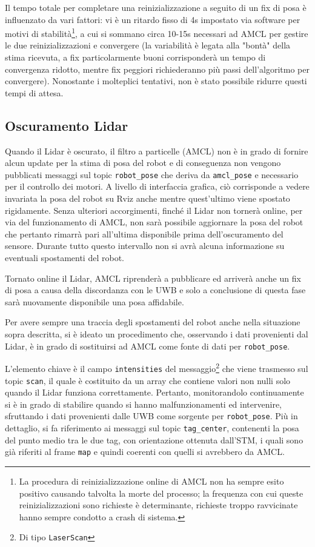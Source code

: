 Il tempo totale per completare una reinizializzazione a seguito di un fix di posa è influenzato da vari fattori: vi è un ritardo fisso di 4s impostato via software per motivi di stabilità\footnote{La procedura di reinizializzazione online di AMCL non ha sempre esito positivo causando talvolta la morte del processo; la frequenza con cui queste reinizializzazioni sono richieste è determinante, richieste troppo ravvicinate hanno sempre condotto a crash di sistema.}, a cui si sommano circa 10-15s necessari ad AMCL per gestire le due reinizializzazioni e convergere (la variabilità è legata alla "bontà" della stima ricevuta, a fix particolarmente buoni corrisponderà un tempo di convergenza ridotto, mentre fix peggiori richiederanno più passi dell'algoritmo per convergere). Nonostante i molteplici tentativi, non è stato possibile ridurre questi tempi di attesa.

\subsection{Oscuramento Lidar}
\label{correzione_oscuramento_lidar}
Quando il Lidar è oscurato, il filtro a particelle (AMCL) non è in grado di fornire alcun update per la stima di posa del robot e di conseguenza non vengono pubblicati messaggi sul topic \texttt{\/robot\_pose} che deriva da \texttt{\/amcl\_pose} e necessario per il controllo dei motori. A livello di interfaccia grafica, ciò corrisponde a vedere invariata la posa del robot su Rviz anche mentre quest'ultimo viene spostato rigidamente. 
Senza ulteriori accorgimenti, finché il Lidar non tornerà online, per via del funzionamento di AMCL, non sarà possibile aggiornare la posa del robot che pertanto rimarrà pari all'ultima disponibile prima dell'oscuramento del sensore. Durante tutto questo intervallo non si avrà alcuna informazione su eventuali spostamenti del robot.

Tornato online il Lidar, AMCL riprenderà a pubblicare ed arriverà anche un fix di posa a causa della discordanza con le UWB e solo a conclusione di questa fase sarà nuovamente disponibile una posa affidabile.

Per avere sempre una traccia degli spostamenti del robot anche nella situazione sopra descritta, si è ideato un procedimento che, osservando i dati provenienti dal Lidar, è in grado di sostituirsi ad AMCL come fonte di dati per \texttt{\/robot\_pose}.

L'elemento chiave è il campo \texttt{intensities} del messaggio\footnote{Di tipo \texttt{LaserScan}} che viene trasmesso sul topic \texttt{\/scan}, il quale è costituito da un array che contiene valori non nulli solo quando il Lidar funziona correttamente. Pertanto, monitorandolo continuamente si è in grado di stabilire quando si hanno malfunzionamenti ed intervenire, sfruttando i dati provenienti dalle UWB come sorgente per \texttt{\/robot\_pose}. Più in dettaglio, si fa riferimento ai messaggi sul topic \texttt{\/tag\_center}, contenenti la posa del punto medio tra le due tag, con orientazione ottenuta dall'STM, i quali sono già riferiti al frame \texttt{map} e quindi coerenti con quelli si avrebbero da AMCL. 


